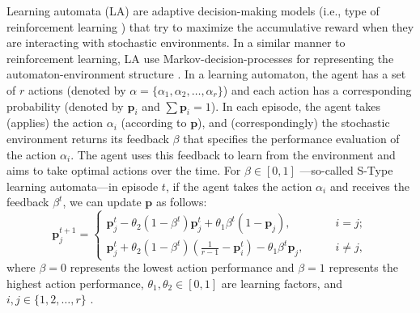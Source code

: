 \documentclass[fleqn,10pt]{wlscirep}
\begin{document}
Learning automata (LA) \cite{narendra2012learning} are adaptive decision-making models (i.e., type of reinforcement learning \cite{kaelbling1996reinforcement}) that try to maximize the accumulative reward when they are interacting with stochastic environments. In a similar manner to reinforcement learning, LA use Markov-decision-processes for representing the automaton-environment structure \cite{kaelbling1996reinforcement,narendra2012learning,sutton2018reinforcement}. In a learning automaton, the agent has a set of ${r}$ actions (denoted by ${\alpha} = \{ {\alpha}_1, {\alpha}_2, \dots, {\alpha}_r \}$) and each action has a corresponding probability (denoted by $\boldsymbol{p}_i$ and $\sum{\boldsymbol{p}_i}=1$). In each episode, the agent takes (applies) the action ${\alpha}_i$ (according to $\boldsymbol{p}$), and (correspondingly) the stochastic environment returns its feedback $\beta$ that specifies the performance evaluation of the action ${\alpha}_i$. The agent uses this feedback to learn from the environment and aims to take optimal actions over the time. For $\beta \in [0,1]$ —so-called S-Type learning automata—in episode ${t}$, if the agent takes the action ${\alpha}_i$ and receives the feedback $\beta^{t}$, we can update $\boldsymbol{p}$ as follows:
\begin{equation}
	\label{eqn:la_singletask_update}
	\boldsymbol{p}_j^{t+1} = 
	\begin{cases}
		\boldsymbol{p}_j^{t} -\theta_2 \left({1-\beta^{t}}\right) \boldsymbol{p}_j^{t} + \theta_1 \beta^{t} \left({1-\boldsymbol{p}_j}\right), \quad \quad  & i=j;\\
		\boldsymbol{p}_j^{t} + \theta_2 \left({1-\beta^{t}}\right) \left({\frac{1}{r-1}-\boldsymbol{p}_i^{t}}\right) - \theta_1 \beta^{t} \boldsymbol{p}_{j}, \quad \quad  & i \ne j,
	\end{cases}
\end{equation}
where $\beta=0$ represents the lowest action performance and $\beta=1$ represents the highest action performance, $\theta_1 , \theta_2 \in [0,1]$ are learning factors, and $i,j \in \{1, 2, \dots, r \}$ \cite{narendra2012learning}.  
\end{document}
